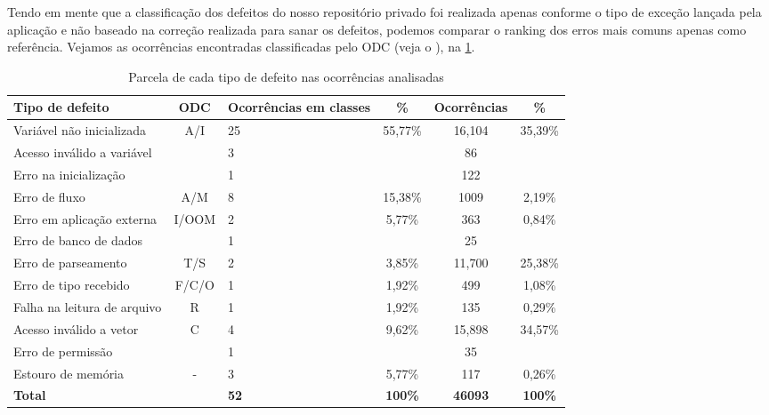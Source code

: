 Tendo em mente que a classificação dos defeitos do nosso repositório privado foi realizada apenas conforme o tipo de exceção lançada pela aplicação e não baseado na correção realizada para sanar os defeitos, podemos comparar o ranking dos erros mais comuns apenas como referência. Vejamos as ocorrências encontradas classificadas pelo ODC (veja o ), na \cref{table:our_results_classified_by_odc}.

\begin{table}[H]
    \centering
    \begin{tabularx}{\linewidth}{ X|c|X|c|c|c }
        \textbf{Tipo de defeito} & \textbf{ODC} & \textbf{Ocorrências em classes} & \textbf{\%} & \textbf{Ocorrências} & \textbf{\%} \\
        \hline
        Variável não inicializada & \multirow{3}{*}{ A/I } & 25 & \multirow{3}{*}{ 55,77\% } & 16,104 & 
        \multirow{3}{*}{ 35,39\% } \\
        Acesso inválido a variável & & 3 & & 86 & \\
        Erro na inicialização & & 1 & & 122 & \\
        \hline
        Erro de fluxo & A/M & 8 & 15,38\% & 1009 & 2,19\% \\
        \hline
        Erro em aplicação externa & \multirow{2}{*}{I/OOM} & 2 & \multirow{2}{*}{5,77\%} & 363 & \multirow{2}{*}{0,84\%} \\
        Erro de banco de dados & & 1 & & 25 \\
        \hline
        Erro de parseamento & T/S & 2 & 3,85\% & 11,700 & 25,38\% \\
        \hline
        Erro de tipo recebido & F/C/O & 1 & 1,92\% & 499 & 1,08\% \\
        \hline
        Falha na leitura de arquivo & R & 1 & 1,92\% & 135 & 0,29\% \\
        \hline
        Acesso inválido a vetor & \multirow{2}{*}{C} & 4 & \multirow{2}{*}{9,62\%} & 15,898 & \multirow{2}{*}{34,57\%} \\
        Erro de permissão & & 1 & & 35 & \\
        \hline
        Estouro de memória & - & 3 & 5,77\% & 117 & 0,26\% \\
        \hline
        \multicolumn{2}{l|}{\textbf{Total}} & \textbf{52} & \textbf{100\%} & \textbf{46093} & \textbf{100\%} \\
    \end{tabularx}
    \caption{Parcela de cada tipo de defeito nas ocorrências analisadas}
    \label{table:our_results_classified_by_odc}
\end{table}

